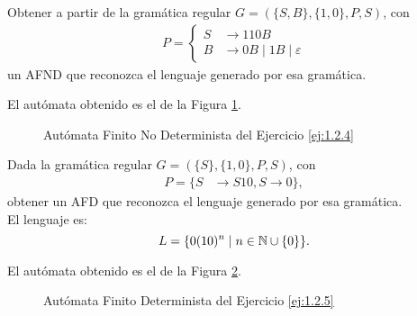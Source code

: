 \begin{ejercicio} \label{ej:1.2.4}
    Obtener a partir de la gramática regular $G = (\{S, B\}, \{1, 0\}, P, S)$, con
    \begin{align*}
        P = \left\{
            \begin{aligned}
                S &\to 110B \\
                B &\to 0B \mid 1B \mid \varepsilon
            \end{aligned}
        \right.
    \end{align*}
    un AFND que reconozca el lenguaje generado por esa gramática.

    El autómata obtenido es el de la Figura \ref{fig:ej:1.2.4}.
    \begin{figure}[H]
        \centering
        \caption{Autómata Finito No Determinista del Ejercicio \ref{ej:1.2.4}}
        \label{fig:ej:1.2.4}
    \end{figure}
\end{ejercicio}

\begin{ejercicio} \label{ej:1.2.5}
    Dada la gramática regular $G = (\{S\}, \{1, 0\}, P, S)$, con
    \begin{align*}
        P = \{S &\to S10, S \to 0\},
    \end{align*}
    obtener un AFD que reconozca el lenguaje generado por esa gramática.\\

    El lenguaje es:
    \begin{equation*}
        L = \{0(10)^n \mid n\in \mathbb{N}\cup \{0\}\}.
    \end{equation*}

    El autómata obtenido es el de la Figura \ref{fig:ej:1.2.5}.
    \begin{figure}[H]
        \centering
        \caption{Autómata Finito Determinista del Ejercicio \ref{ej:1.2.5}}
        \label{fig:ej:1.2.5}
    \end{figure}
\end{ejercicio}

